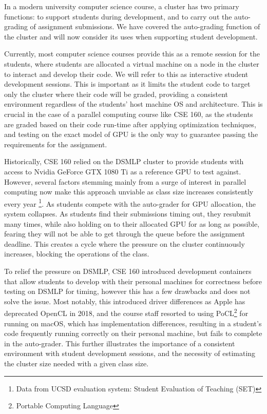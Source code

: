 \documentclass[acmlarge]{acmart}
\begin{document}
In a modern university computer science course, a cluster has two primary functions: to support students during development, and to carry out the auto-grading of assignment submissions. We have covered the auto-grading function of the cluster and will now consider its uses when supporting student development. 

Currently, most computer science courses provide this as a remote session for the students, where students are allocated a virtual machine on a node in the cluster to interact and develop their code. We will refer to this as interactive student development sessions. This is important as it limits the student code to target only the cluster where their code will be graded, providing a consistent environment regardless of the students’ host machine OS and architecture. This is crucial in the case of a parallel computing course like CSE 160, as the students are graded based on their code run-time after applying optimization techniques, and testing on the exact model of GPU is the only way to guarantee passing the requirements for the assignment.

Historically, CSE 160 relied on the DSMLP cluster to provide students with access to Nvidia GeForce GTX 1080 Ti as a reference GPU to test against. However, several factors stemming mainly from a surge of interest in parallel computing now make this approach unviable as class size increases consistently every year \footnote{Data from UCSD evaluation system: Student Evaluation of Teaching (SET)}. As students compete with the auto-grader for GPU allocation, the system collapses. As students find their submissions timing out, they resubmit many times, while also holding on to their allocated GPU for as long as possible, fearing they will not be able to get through the queue before the assignment deadline. This creates a cycle where the pressure on the cluster continuously increases, blocking the operations of the class.

To relief the pressure on DSMLP, CSE 160 introduced development containers that allow students to develop with their personal machines for correctness before testing on DSMLP for timing, however this has a few drawbacks and does not solve the issue. Most notably, this introduced driver differences as Apple has deprecated OpenCL in 2018, and the course staff resorted to using PoCL\footnote{Portable Computing Language} for running on macOS, which has implementation differences, resulting in a student’s code frequently running correctly on their personal machine, but fails to complete in the auto-grader. This further illustrates the importance of a consistent environment with student development sessions, and the necessity of estimating the cluster size needed with a given class size.
\end{document}
